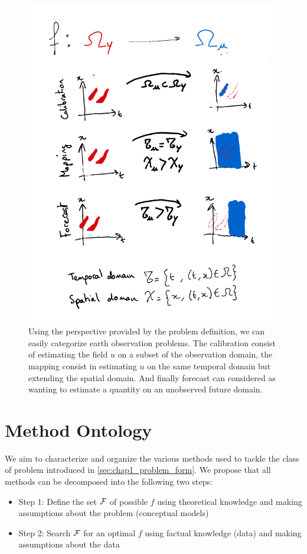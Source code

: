 \begin{bibunit}
{{{{\begin{figure}[htbp]
\begin{center}
\includegraphics[width=0.8\linewidth]{Chapitre1/Ch1-Figures/Task_ontology.png}
\end{center}
\caption[Task characterization through the domains $\Omega_u$ and $\Omega_y$ of $u$ and $y$]
{\footnotesize Using the perspective provided by the problem definition, we can easily categorize earth observation problems.
The calibration consist of estimating the field $u$ on a subset of the observation domain, the mapping consist in estimating $u$ on the same temporal domain but extending the spatial domain.
And finally forecast can considered as wanting to estimate a quantity on an unobserved future domain.}
\label{fig:task_ontology}
\end{figure}

\section{Method Ontology}
We aim to characterize and organize the various methods used to tackle the class of problem introduced in \ref{sec:chap1_problem_form}. We propose that all methods can be decomposed into the following two steps:
\begin{itemize}
\item Step 1: Define the set $\cal{F}$ of possible $f$ using theoretical knowledge and making assumptions about the problem (conceptual models)
\item Step 2: Search $\cal{F}$ for an optimal $f$ using factual knowledge (data) and making assumptions about the data
\end{itemize}

}}}}
\end{bibunit}
